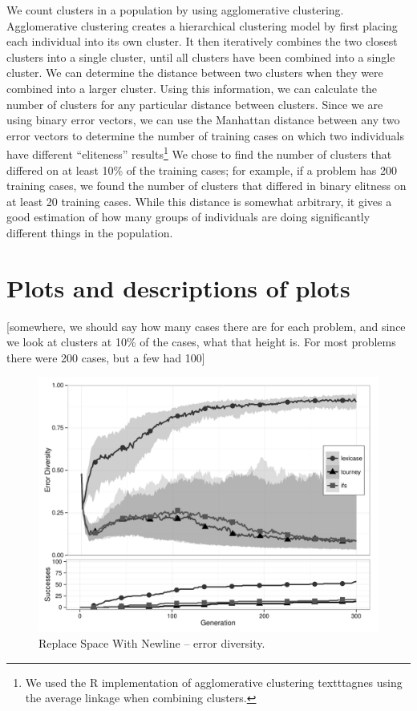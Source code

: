 We count clusters in a population by using agglomerative clustering. Agglomerative clustering creates a hierarchical clustering model by first placing each individual into its own cluster. It then iteratively combines the two closest clusters into a single cluster, until all clusters have been combined into a single cluster. We can determine the distance between two clusters when they were combined into a larger cluster. Using this information, we can calculate the number of clusters for any particular distance between clusters. Since we are using binary error vectors, we can use the Manhattan distance between any two error vectors to determine the number of training cases on which two individuals have different ``eliteness'' results\footnote{We used the R implementation of agglomerative clustering texttt{agnes} using the average linkage when combining clusters.} We chose to find the number of clusters that differed on at least 10\% of the training cases; for example, if a problem has 200 training cases, we found the number of clusters that differed in binary elitness on at least 20 training cases. While this distance is somewhat arbitrary, it gives a good estimation of how many groups of individuals are doing significantly different things in the population.


\section{Plots and descriptions of plots}

[somewhere, we should say how many cases there are for each problem, and since we look at clusters at 10\% of the cases, what that height is. For most problems there were 200 cases, but a few had 100]


\begin{figure}%
\centering
\includegraphics[width=11.5cm]{replace-space-with-newline-diversity.pdf}
\caption{Replace Space With Newline -- error diversity.}
\label{rswnDiv}
\end{figure}

